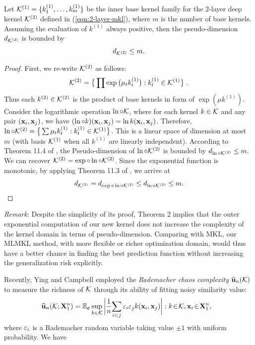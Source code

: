 \begin{theorem} \label{thm:psd-dim-layer2-mkl}
Let ${\mathcal K}^{(1)} = \{k_1^{(1)},\ldots, k_m^{(1)}\}$ be the inner base kernel family for
the 2-layer deep kernel ${\mathcal K}^{(2)}$ defined in (\ref{eqn:2-layer-mkl}), where $m$ is
the number of base kernels. Assuming the evaluation of $k^{(1)}$ always positive,
then the pseudo-dimension $d_{{\mathcal K}^{(2)}}$ is bounded by
\[
d_{{\mathcal K}^{(2)}} \leq m.
\]
\end{theorem}
\begin{proof}
First, we re-write ${\mathcal K}^{(2)}$ as follows:
\[{\mathcal K}^{(2)} = \big\{ \prod \exp\big(\mu_tk^{(1)}_t\big): k^{(1)}_t \in
{\mathcal K}^{(1)} \big\}\;.\]
Thus each $k^{(2)} \in {\mathcal K}^{(2)}$ is the product of base kernels in
form of $\exp(\mu k^{(1)})$. Consider the logarithmic operation $\ln\circ{\mathcal K}$, where
for each kernel $k \in {\mathcal K}$ and any pair $({\bf x}_i, {\bf x}_j)$, we have $(\ln\circ k)({\bf x}_i, {\bf x}_j)
= \ln k({\bf x}_i, {\bf x}_j)$. Therefore, $\ln\circ{\mathcal K}^{(2)} = \big\{\sum\mu_t k_t^{(1)}:
k_t^{(1)}\in{\mathcal K}^{(1)}\big\}$. This is a linear space of dimension at most $m$ (with
basis ${\mathcal K}^{(1)}$ when all $k^{(1)}$ are linearly independent). According to Theorem
11.4 of \cite{Anthony99}, the Pseudo-dimension \cite{colt/SrebroB06} of
$\ln\circ{\mathcal K}^{(2)}$ is bounded by $d_{\ln\circ{\mathcal K}^{(2)}} \leq m.$ We can recover
${\mathcal K}^{(2)} = \exp\circ\ln\circ{\mathcal K}^{(2)}$. Since the exponential function is monotonic, by applying Theorem 11.3 of \cite{Anthony99}, we arrive at
\begin{equation}
d_{\k^{(2)}} = d_{\exp\circ\ln\circ\k^{(2)}} \leq d_{\ln\circ\k^{(2)}} \leq m . \label{eqn:pseudo-dim}
\end{equation}
\end{proof}

{\it Remark}: Despite the simplicity of its proof, Theorem 2 implies that the outer exponential computation of our new kernel does not increase the complexity of the kernel domain in terms of pseudo-dimension. Comparing with MKL, our MLMKL method, with more flexible or richer optimization domain, would thus have a better chance in finding the best prediction function without increasing the generalization risk explicitly.

Recently, Ying and Campbell \cite{colt/YingC09} employed the {\em Rademacher chaos complexity} ${\widehat{{\bf u}}_n}({\mathcal K})$ to measure the richness of ${\mathcal K}$ through its ability of fitting noisy similarity value:
\[
\hspace{-0.1in} \eu(\k;\mathbf X^n_1) = \e_{\bm\varepsilon}\sup_{k\in\k}\bigg|\frac{1}{n} \!\sum_{i < j} \v_i\v_jk(\x_i, \x_j)\bigg|: k \!\in\! \k, \x_i\!\in\!\mathbf X^n_1,
\]
where ${\varepsilon}_i$ is a Rademacher random variable taking value $\pm1$ with uniform
probability. We have

